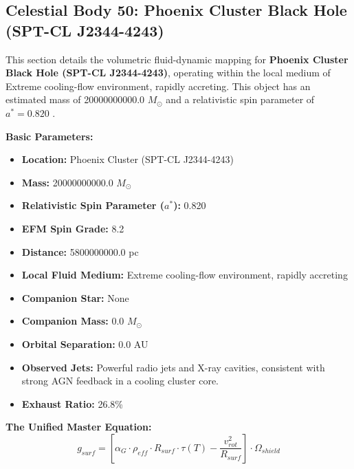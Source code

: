\documentclass[11pt, a4paper]{article}
\begin{document}
\clearpage
\subsection{Celestial Body 50: Phoenix Cluster Black Hole (SPT-CL J2344-4243)}
This section details the volumetric fluid-dynamic mapping for \textbf{Phoenix Cluster Black Hole (SPT-CL J2344-4243)}, operating within the local medium of Extreme cooling-flow environment, rapidly accreting. This object has an estimated mass of 20000000000.0 $M_{\odot}$ and a relativistic spin parameter of $a^* = 0.820$ \cite{mcdonald2012, ned}.

\vspace{0.5em}
\noindent \textbf{Basic Parameters:}
\begin{itemize}
  \item \textbf{Location:} Phoenix Cluster (SPT-CL J2344-4243)
  \item \textbf{Mass:} 20000000000.0 $M_{\odot}$
  \item \textbf{Relativistic Spin Parameter ($a^*$):} 0.820
  \item \textbf{EFM Spin Grade:} 8.2
  \item \textbf{Distance:} 5800000000.0 pc
  \item \textbf{Local Fluid Medium:} Extreme cooling-flow environment, rapidly accreting
  \item \textbf{Companion Star:} None
  \item \textbf{Companion Mass:} 0.0 $M_{\odot}$
  \item \textbf{Orbital Separation:} 0.0 AU
  \item \textbf{Observed Jets:} Powerful radio jets and X-ray cavities, consistent with strong AGN feedback in a cooling cluster core.
  \item \textbf{Exhaust Ratio:} 26.8\%
\end{itemize}

\vspace{0.5em}
\noindent \textbf{The Unified Master Equation:}
$$ g_{surf} = \left[ \alpha_G \cdot \rho_{eff} \cdot R_{surf} \cdot \tau(T) - \frac{v_{rot}^2}{R_{surf}} \right] \cdot \Omega_{shield} $$
\end{document}
